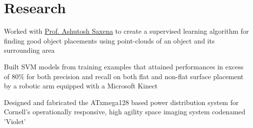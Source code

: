 \documentclass[]{deedy-resume-openfont}
\begin{document}
\section{Research}
            \begin{tightemize}
                \item
                    Worked with \href{http://www.cs.cornell.edu/~asaxena/}{
                    Prof. Ashutosh Saxena} to create a supervised learning
                    algorithm for finding good object placements using
                    point-clouds of an object and its surrounding area
                \item
                    Built SVM models from training examples that attained
                    performances in excess of 80\% for both precision and
                    recall on both flat and non-flat surface placement by
                    a robotic arm
                    equipped with a Microsoft Kinect
            \end{tightemize}
    \sectionsep

            \begin{tightemize}
                \item
                    Designed and fabricated the ATxmega128 based power
                    distribution system for Cornell’s operationally responsive,
                    high agility space imaging system codenamed 'Violet'
            \end{tightemize}
    \sectionsep
\end{document}
